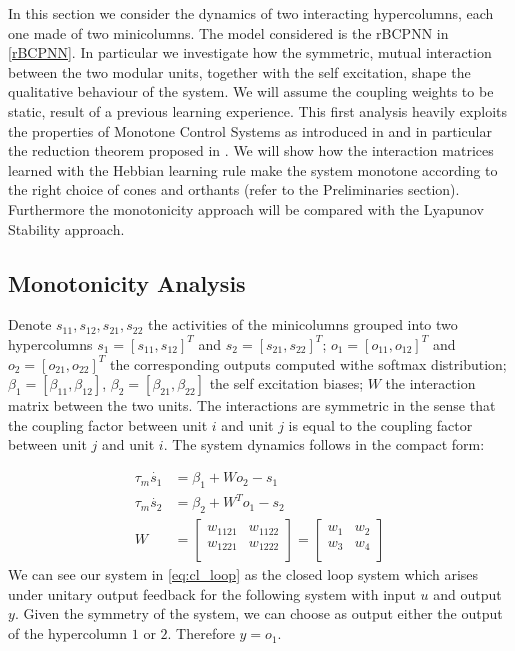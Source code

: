 In this section we consider the dynamics of two interacting hypercolumns, each one made of two minicolumns. The model considered is the rBCPNN in \cref{rBCPNN}. In particular we investigate how the symmetric, mutual interaction between the two modular units, together with the self excitation, shape the qualitative behaviour of the system. We will assume the coupling  weights to be static, result of a previous learning experience. This first analysis heavily exploits the properties of Monotone Control Systems as introduced in \cite{angeli2003monotone} and in particular the reduction theorem proposed in \cite{enciso2005monotone}. We will show how the interaction matrices learned with the Hebbian learning rule make the system monotone according to the right choice of cones and orthants (refer to the Preliminaries section). Furthermore the monotonicity approach will be compared with the Lyapunov Stability approach.

\subsection{Monotonicity Analysis}
Denote $s_{11}, s_{12}, s_{21}, s_{22}$ the activities of the minicolumns grouped into two hypercolumns $s_1 = [s_{11}, s_{12}]^T$ and $s_2 = [s_{21}, s_{22}]^T$;  $o_1 = [o_{11}, o_{12}]^T$ and $o_2 = [o_{21}, o_{22}]^T$ the corresponding outputs computed withe softmax distribution; $\beta_1 = [\beta_{11}, \beta_{12}]$, $\beta_2 = [\beta_{21}, \beta_{22}]$ the self excitation biases; $W$ the interaction matrix between the two units. The interactions are symmetric in the sense that the coupling factor between unit $i$ and unit $j$ is equal to the coupling factor between unit $j$ and unit $i$. The system dynamics follows in the compact form:

\begin{equation}
\begin{aligned}
\tau_m \dot{s_1} &= \beta_{1} + Wo_{2}-s_{1} \\
\tau_m \dot{s_2} &= \beta_{2} + W^{T}o_{1}-s_{2} \\
W & =
\begin{bmatrix}
 w_{1121} & w_{1122} \\
 w_{1221} & w_{1222} \\
\end{bmatrix} = 
\begin{bmatrix}
 w_{1} & w_{2} \\
 w_{3} & w_{4} \\
\end{bmatrix} 
\end{aligned}
\label{eq:cl_loop}
\end{equation}
We can see our system in \eqref{eq:cl_loop} as the closed loop system which arises under unitary output feedback for the following system with input $u$ and output $y$. Given the symmetry of the system, we can choose as output either the output of the hypercolumn $1$ or $2$. Therefore $y=o_1$.

